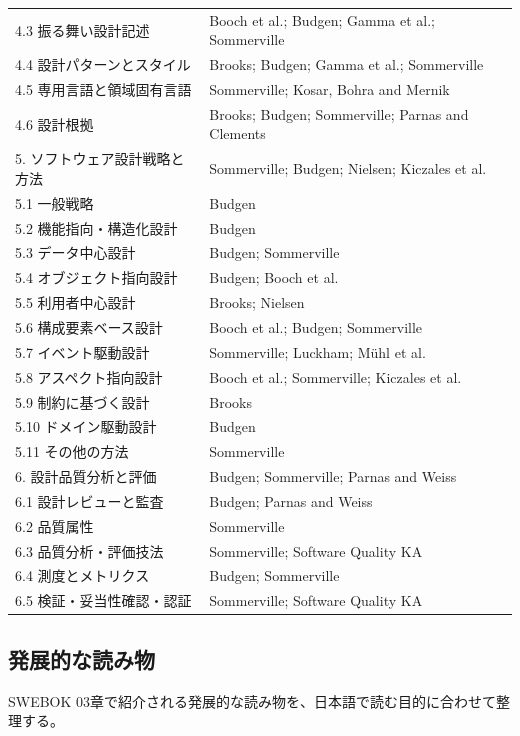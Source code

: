 \documentclass[a4paper,11pt]{ltjsarticle}
\numberwithin{figure}{section}
\numberwithin{table}{section}
\begin{document}
\begin{longtable}{L{66mm}L{98mm}}
4.3 振る舞い設計記述 & Booch et al.; Budgen; Gamma et al.; Sommerville \\
4.4 設計パターンとスタイル & Brooks; Budgen; Gamma et al.; Sommerville \\
4.5 専用言語と領域固有言語 & Sommerville; Kosar, Bohra and Mernik \\
4.6 設計根拠 & Brooks; Budgen; Sommerville; Parnas and Clements \\
5. ソフトウェア設計戦略と方法 & Sommerville; Budgen; Nielsen; Kiczales et al. \\
5.1 一般戦略 & Budgen \\
5.2 機能指向・構造化設計 & Budgen \\
5.3 データ中心設計 & Budgen; Sommerville \\
5.4 オブジェクト指向設計 & Budgen; Booch et al. \\
5.5 利用者中心設計 & Brooks; Nielsen \\
5.6 構成要素ベース設計 & Booch et al.; Budgen; Sommerville \\
5.7 イベント駆動設計 & Sommerville; Luckham; Mühl et al. \\
5.8 アスペクト指向設計 & Booch et al.; Sommerville; Kiczales et al. \\
5.9 制約に基づく設計 & Brooks \\
5.10 ドメイン駆動設計 & Budgen \\
5.11 その他の方法 & Sommerville \\
6. 設計品質分析と評価 & Budgen; Sommerville; Parnas and Weiss \\
6.1 設計レビューと監査 & Budgen; Parnas and Weiss \\
6.2 品質属性 & Sommerville \\
6.3 品質分析・評価技法 & Sommerville; Software Quality KA \\
6.4 測度とメトリクス & Budgen; Sommerville \\
6.5 検証・妥当性確認・認証 & Sommerville; Software Quality KA \\
\bottomrule
\end{longtable}

\subsection{発展的な読み物}

SWEBOK 03章で紹介される発展的な読み物を、日本語で読む目的に合わせて整理する。
\end{document}
